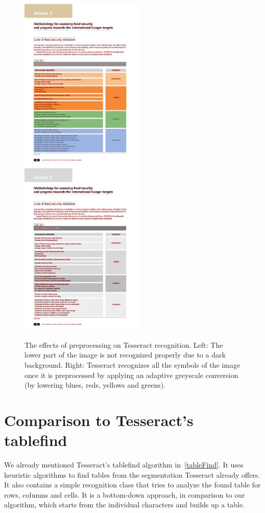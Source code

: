 \begin{figure}[t]
\centering

\includegraphics[width=16em]{img/results/im2_noPreproc.png}
\includegraphics[width=16em]{img/results/im2_Preproc.png}

\caption{The effects of preprocessing on Tesseract recognition. Left: The lower part of the image is not recognized properly due to a dark background. Right: Tesseract recognizes all the symbols of the image once it is preprocessed by applying an adaptive greyscale conversion (by lowering blues, reds, yellows and greens).}
\label{fig:preprocessEffectsAdapt}
\end{figure}

\section{Comparison to Tesseract's tablefind} \label{resultsTableFind}

We already mentioned Tesseract's tablefind algorithm in~\cref{tableFind}. It uses heuristic algorithms to find tables from the segmentation Tesseract already offers. It also contains a simple recognition class that tries to analyze the found table for rows, columns and cells. It is a bottom-down approach, in comparison to our algorithm, which starts from the individual characters and builds up a table.

